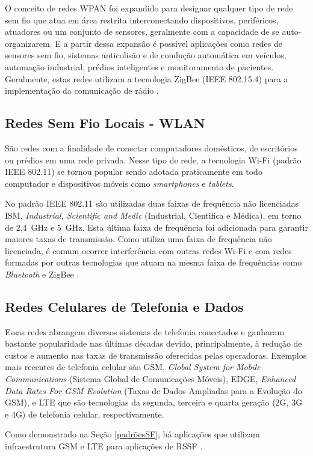 O conceito de redes WPAN foi expandido para designar qualquer tipo de rede sem fio que atua em área restrita interconectando dispositivos, periféricos, atuadores ou um conjunto de sensores, geralmente com a capacidade de se auto-organizarem. E a partir dessa expansão é possível aplicações como redes de sensores sem fio, sistemas anticolisão e de condução automática em veículos, automação industrial, prédios inteligentes e monitoramento de pacientes. Geralmente, estas redes utilizam a tecnologia ZigBee (IEEE 802.15.4) para a implementação da comunicação de rádio \cite{rochol2018sistemas}.

\subsection{Redes Sem Fio Locais - WLAN}
São redes com a finalidade de conectar computadores domésticos, de escritórios ou prédios em uma rede privada. Nesse tipo de rede, a tecnologia Wi-Fi (padrão IEEE 802.11) se tornou popular sendo adotada praticamente em todo computador e dispositivos móveis como \emph{smartphones} e \emph{tablets}.

No padrão IEEE 802.11 são utilizadas duas faixas de frequência não licenciadas ISM, \emph{Industrial, Scientific and Medic} (Industrial, Cientifica e Médica), em torno de 2,4~GHz e 5~GHz. Esta última faixa de frequência foi adicionada para garantir maiores taxas de transmissão. Como utiliza uma faixa de frequência não licenciada, é comum ocorrer interferência com outras redes Wi-Fi e com redes formadas por outras tecnologias que atuam na mesma faixa de frequências como \emph{Bluetooth} e ZigBee \cite{rochol2018sistemas}.

\subsection{Redes Celulares de Telefonia e Dados}
Essas redes abrangem diversos sistemas de telefonia conectados e ganharam bastante popularidade nas últimas décadas devido, principalmente, à redução de custos e aumento nas taxas de transmissão oferecidas pelas operadoras. Exemplos mais recentes de telefonia celular são GSM, \emph{Global System for Mobile Communications} (Sistema Global de Comunicações Móveis), EDGE, \emph{Enhanced Data Rates For GSM Evolution} (Taxas de Dados Ampliadas para a Evolução do GSM), e LTE que são tecnologias da segunda, terceira e quarta geração (2G, 3G e 4G) de telefonia celular, respectivamente.

Como demonstrado na Seção \ref{padrõesSF}, há aplicações que utilizam infraestrutura GSM e LTE para aplicações de RSSF \cite{rochol2018sistemas}.


